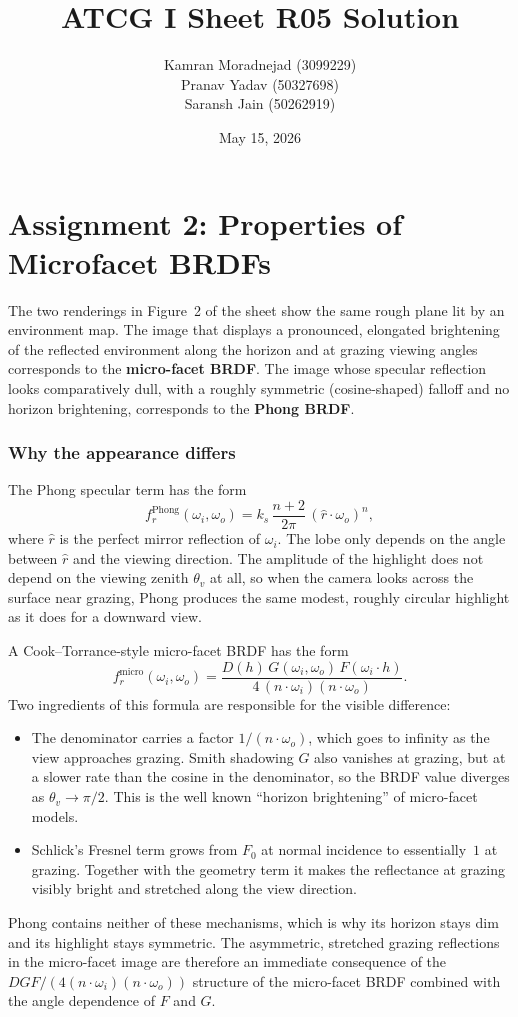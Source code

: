 \documentclass[a4paper,11pt]{article}
\title{ATCG I Sheet R05 Solution}
\author{
\large Kamran Moradnejad (3099229) \\
\large Pranav Yadav (50327698) \\
\large Saransh Jain (50262919)
}
\date{May 15, 2026}
\begin{document}
\maketitle

\section*{Assignment 2: Properties of Microfacet BRDFs}

The two renderings in Figure~2 of the sheet show the same rough plane lit by an
environment map. The image that displays a pronounced, elongated brightening of
the reflected environment along the horizon and at grazing viewing angles
corresponds to the \textbf{micro-facet BRDF}. The image whose specular
reflection looks comparatively dull, with a roughly symmetric (cosine-shaped)
falloff and no horizon brightening, corresponds to the \textbf{Phong BRDF}.

\subsubsection*{Why the appearance differs}

The Phong specular term has the form
\[
f^{\text{Phong}}_r(\omega_i,\omega_o)
   = k_s\,\frac{n+2}{2\pi}\,(\hat{r}\cdot\omega_o)^n,
\]
where $\hat r$ is the perfect mirror reflection of $\omega_i$. The lobe only
depends on the angle between $\hat r$ and the viewing direction. The amplitude
of the highlight does not depend on the viewing zenith $\theta_v$ at all, so
when the camera looks across the surface near grazing, Phong produces the same
modest, roughly circular highlight as it does for a downward view.

A Cook--Torrance-style micro-facet BRDF has the form
\[
f^{\text{micro}}_r(\omega_i,\omega_o)
   = \frac{D(h)\,G(\omega_i,\omega_o)\,F(\omega_i\!\cdot\! h)}{4\,(n\cdot\omega_i)(n\cdot\omega_o)}.
\]
Two ingredients of this formula are responsible for the visible difference:
\begin{itemize}
    \item The denominator carries a factor $1/(n\cdot\omega_o)$, which goes to
    infinity as the view approaches grazing. Smith shadowing $G$ also vanishes
    at grazing, but at a slower rate than the cosine in the denominator, so the
    BRDF value diverges as $\theta_v\!\to\!\pi/2$. This is the well known
    ``horizon brightening'' of micro-facet models.
    \item Schlick's Fresnel term grows from $F_0$ at normal incidence to
    essentially~$1$ at grazing. Together with the geometry term it makes the
    reflectance at grazing visibly bright and stretched along the view
    direction.
\end{itemize}
Phong contains neither of these mechanisms, which is why its horizon stays dim
and its highlight stays symmetric. The asymmetric, stretched grazing
reflections in the micro-facet image are therefore an immediate consequence of
the $DGF/(4(n\!\cdot\!\omega_i)(n\!\cdot\!\omega_o))$ structure of the
micro-facet BRDF combined with the angle dependence of $F$ and $G$.
\end{document}

